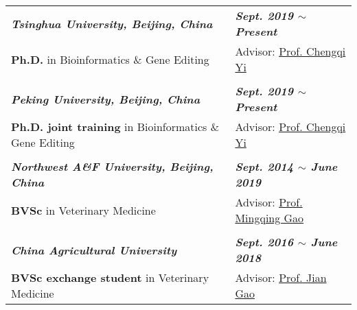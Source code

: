 

\renewcommand{\thefootnote}{\fnsymbol{footnote}}
\setcounter{footnote}{0}
\begin{longtable}{p{} p{}}
    \textit{\textbf{Tsinghua University, Beijing, China}} & \textit{\textbf{Sept. 2019 $\sim$ Present}} \\
    \textbf{Ph.D.} in Bioinformatics \& Gene Editing & Advisor: \href{https://www.bio.pku.edu.cn/enhomes/news/teacher_dis/91.html}{Prof. Chengqi Yi} \\
    & \\
    \textit{\textbf{Peking University, Beijing, China}} & \textit{\textbf{Sept. 2019 $\sim$ Present}} \\
    \textbf{Ph.D. joint training} in Bioinformatics \& Gene Editing & Advisor: \href{https://www.bio.pku.edu.cn/enhomes/news/teacher_dis/91.html}{Prof. Chengqi Yi} \\
    & \\
    \textit{\textbf{Northwest A\&F University, Beijing, China}} & \textit{\textbf{Sept. 2014 $\sim$ June 2019}} \\
    \textbf{BVSc} in Veterinary Medicine & Advisor: \href{https://faculty.nwu.edu.cn/gaomingqing/en/index.htm}{Prof. Mingqing Gao} \\
    & \\
    \textit{\textbf{China Agricultural University}} & \textit{\textbf{Sept. 2016 $\sim$ June 2018}} \\
    \textbf{BVSc exchange student} in Veterinary Medicine & Advisor: \href{https://cvm.cau.edu.cn/art/2017/9/12/art_41957_71.html}{Prof. Jian Gao} \\
\end{longtable}



\renewcommand{\thefootnote}{\arabic{footnote}}
\setcounter{footnote}{1}
